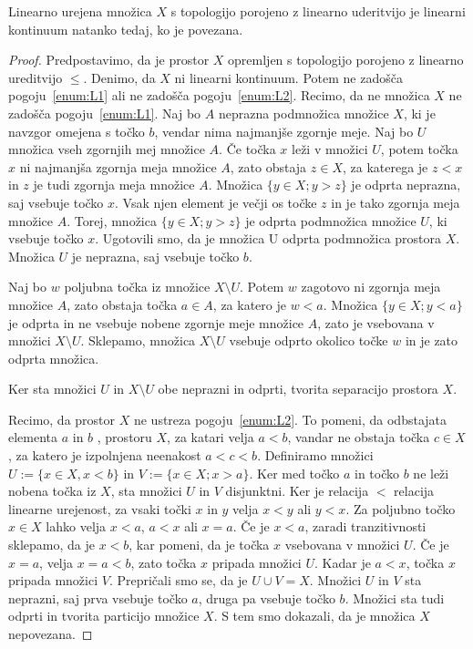 \documentclass[../TG_magistrsko_delo_sections.tex]{subfiles}
\begin{document}
\begin{trditev}
Linearno urejena množica $X$ s topologijo porojeno z linearno uderitvijo je linearni kontinuum natanko tedaj, ko je povezana.
\end{trditev}
\begin{proof}
Predpostavimo, da je prostor $X$ opremljen s topologijo porojeno z linearno ureditvijo $\leq$. Denimo, da $X$ ni linearni kontinuum. Potem ne zadošča pogoju~\ref{enum:L1} ali ne zadošča pogoju~\ref{enum:L2}. Recimo, da ne množica $X$ ne zadošča pogoju~\ref{enum:L1}. Naj bo $A$ neprazna podmnožica množice $X$, ki je navzgor omejena s točko $b$, vendar nima najmanjše zgornje meje. Naj bo $U$ množica vseh zgornjih mej množice $A$. Če točka $x$ leži v množici $U$, potem točka $x$ ni najmanjša zgornja meja množice $A$, zato obstaja $z \in X$, za katerega je $z < x$ in $z$ je tudi zgornja meja množice $A$. Množica $\{y \in X; y > z\}$ je odprta neprazna, saj vsebuje točko $x$. Vsak njen element je večji os točke $z$ in je tako zgornja meja množice $A$. Torej, množica $\{y \in X; y > z\}$ je odprta podmnožica množice $U$, ki vsebuje točko $x$. Ugotovili smo, da je množica U odprta podmnožica prostora $X$. Množica $U$ je neprazna, saj vsebuje točko $b$. 

Naj bo $w$ poljubna točka iz množice $X \setminus U$. Potem $w$ zagotovo ni zgornja meja množice $A$, zato obstaja točka $a \in A$, za katero je $w < a$. Množica $\{y \in X; y< a\}$ je odprta in ne vsebuje nobene zgornje meje množice $A$, zato je vsebovana v množici $X \setminus U$. Sklepamo, množica $X \setminus U$ vsebuje odprto okolico točke $w$ in je zato odprta množica. 

Ker sta množici $U$ in $X \setminus U$ obe neprazni in odprti, tvorita separacijo prostora $X$. 

Recimo, da prostor $X$ ne ustreza pogoju~\ref{enum:L2}. To pomeni, da odbstajata elementa $a$ in $b$ , prostoru $X$, za katari velja $a < b$, vandar ne obstaja točka $c \in X$, za katero je izpolnjena neenakost $a < c < b$. Definiramo množici $U := \{x \in X, x <b\}$ in $V:= \{x\in X;x>a\}$. Ker med točko $a$ in točko $b$ ne leži nobena točka iz $X$, sta množici $U$ in $V$ disjunktni. Ker je relacija $<$ relacija linearne urejenost, za vsaki točki $x$ in $y$ velja $x < y$ ali $y < x$. Za poljubno točko $x \in X$ lahko velja $x<a$, $a<x$ ali $x=a$.
Če je $x<a$, zaradi tranzitivnosti sklepamo, da je $x<b$, kar pomeni, da je točka $x$ vsebovana v množici $U$. Če je $x=a$, velja $x=a<b$, zato točka $x$ pripada množici $U$. Kadar je $a<x$, točka $x$ pripada množici $V$. Prepričali smo se, da je $U \cup V = X$. Množici $U$ in $V$ sta neprazni, saj prva vsebuje točko $a$, druga pa vsebuje točko $b$. Množici sta tudi odprti in tvorita particijo množice $X$. S tem smo dokazali, da je množica $X$ nepovezana.


\end{proof}
\end{document}
